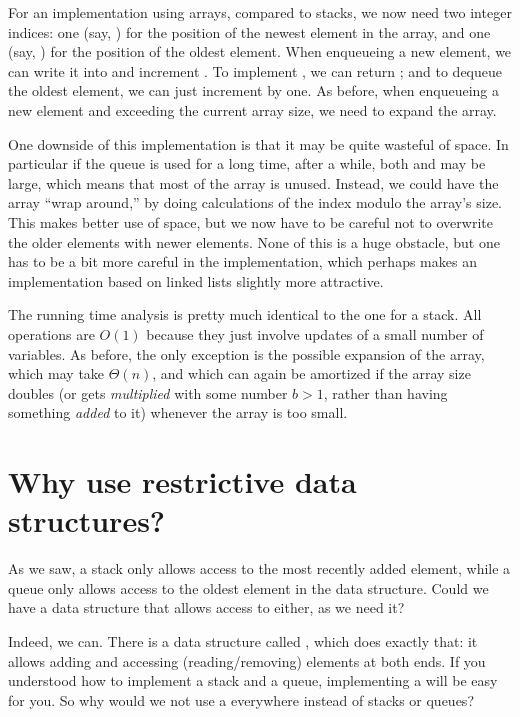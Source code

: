 For an implementation using arrays, compared to stacks, we now need
two integer indices: one (say, ) for the position of the
newest element in the array, and one (say, ) for the
position of the oldest element. 
When enqueueing a new element,
we can write it into  and increment .
To implement , we can return ;
and to dequeue the oldest element,
we can just increment  by one.
As before, when enqueueing a new element and exceeding the current
array size, we need to expand the array.

One downside of this implementation is that it may be quite wasteful
of space.
In particular if the queue is used for a long time, after a while,
both  and  may be large,
which means that most of the array is unused.
Instead, we could have the array ``wrap around,''
by doing calculations of the index  modulo the array's size.
This makes better use of space, but we now have to be careful not to
overwrite the older elements with newer elements.
None of this is a huge obstacle, but one has to be a bit more careful
in the implementation, which perhaps makes an implementation based on linked
lists slightly more attractive.

The running time analysis is pretty much identical to the one for a
stack.
All operations are $O(1)$ because they just involve updates of a small
number of variables.
As before, the only exception is the possible expansion of the array,
which may take $\Theta(n)$,
and which can again be amortized if the array size doubles
(or gets \emph{multiplied} with some number $b > 1$, rather than
having something \emph{added} to it) whenever the array is too small. 

\section{Why use restrictive data structures?}
As we saw, a stack only allows access to the most recently
added element, while a queue only allows access to the oldest element
in the data structure.
Could we have a data structure that allows access to either, as we need it?

Indeed, we can.
There is a data structure called ,
which does exactly that:
it allows adding and accessing (reading/removing) elements at both ends.
If you understood how to implement a stack and a queue,
implementing a  will be easy for you.
So why would we not use a  everywhere instead of stacks or
queues?

